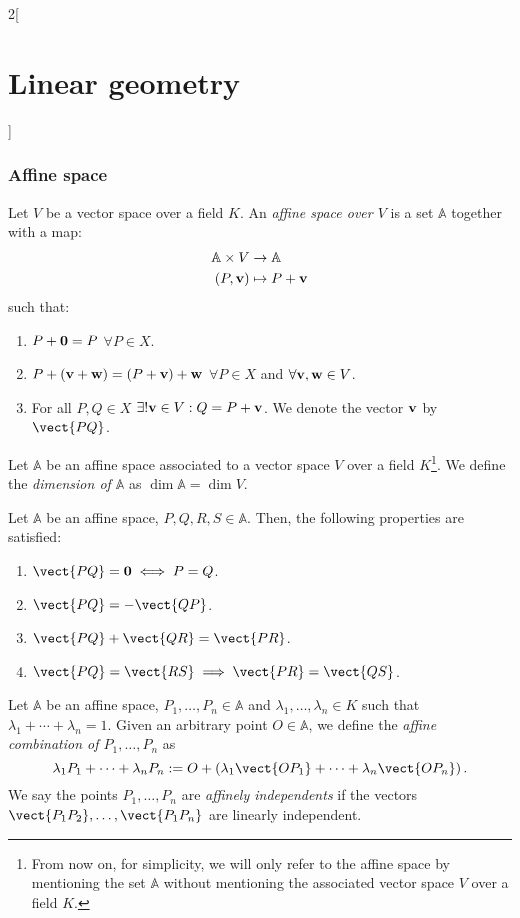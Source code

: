 \documentclass[../../../main.tex]{subfiles}
\begin{document}
\begin{multicols}{2}[\section{Linear geometry}]
  \subsubsection{Affine space}
  \begin{definition}
    Let $V$ be a vector space over a field $K$. An \textit{affine space over $V$} is a set $\mathbb{A}$ together with a map:
    \begin{align*}
      \mathbb{A}\times V     & \rightarrow \mathbb{A}       \\
      (P,\boldsymbol{\mathrm{v}}) & \mapsto P+\boldsymbol{\mathrm{v}}
    \end{align*}
    such that:
    \begin{enumerate}
      \item $P+\boldsymbol{\mathrm{0}}=P$ $\forall P\in X$.
      \item $P+(\boldsymbol{\mathrm{v}}+\boldsymbol{\mathrm{w}})=(P+\boldsymbol{\mathrm{v}})+\boldsymbol{\mathrm{w}}$ $\forall P\in X$ and $\forall\boldsymbol{\mathrm{v}},\boldsymbol{\mathrm{w}}\in V$.
      \item For all $P,Q\in X$ $\exists!\boldsymbol{\mathrm{v}}\in V:Q=P+\boldsymbol{\mathrm{v}}$. We denote the vector $\boldsymbol{\mathrm{v}}$ by $\vect{PQ}$.
    \end{enumerate}
  \end{definition}
  \begin{definition}
    Let $\mathbb{A}$ be an affine space associated to a vector space $V$ over a field $K$\footnote{From now on, for simplicity, we will only refer to the affine space by mentioning the set $\mathbb{A}$ without mentioning the associated vector space $V$ over a field $K$.}. We define the \textit{dimension of $\mathbb{A}$} as $\dim\mathbb{A}=\dim V$.
  \end{definition}
  \begin{prop}
    Let $\mathbb{A}$ be an affine space, $P,Q,R,S\in\mathbb{A}$. Then, the following properties are satisfied:
    \begin{enumerate}
      \item $\vect{PQ}=\vectorfunction{0}\iff P=Q$.
      \item $\vect{PQ}=-\vect{QP}$.
      \item $\vect{PQ}+\vect{QR}=\vect{PR}$.
      \item $\vect{PQ}=\vect{RS}\implies\vect{PR}=\vect{QS}$.
    \end{enumerate}
  \end{prop}
  \begin{definition}
    Let $\mathbb{A}$ be an affine space, $P_1,\ldots,P_n\in\mathbb{A}$ and $\lambda_1,\ldots,\lambda_n\in K$ such that $\lambda_1+\cdots+\lambda_n=1$. Given an arbitrary point $O\in\mathbb{A}$, we define the \textit{affine combination of $P_1,\ldots,P_n$} as $$\lambda_1P_1+\cdots+\lambda_nP_n:=O+\left(\lambda_1\vect{OP_1}+\cdots+\lambda_n\vect{OP_n}\right).$$ We say the points $P_1,\ldots,P_n$ are \textit{affinely independents} if the vectors $\vect{P_1P_2},\ldots,\vect{P_1P_n}$ are linearly independent.

\end{definition}
\end{multicols}
\end{document}
